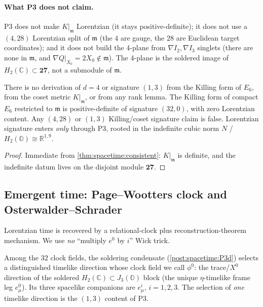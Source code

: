 \paragraph{What P3 does not claim.}
P3 does not make $K|_{\mathfrak m}$ Lorentzian (it stays positive-definite); it does not
use a $(4,28)$ Lorentzian split of $\mathfrak m$ (the $4$ are gauge, the $28$ are
Euclidean target coordinates); and it does not build the 4-plane from $\nabla I_2,
\nabla I_3$ singlets (there are none in $\mathfrak m$, and $\nabla Q|_{X_0}=2X_0\notin\mathfrak m$).
The 4-plane is the soldered image of $H_2(\mathbb C)\subset\mathbf{27}$, not a submodule
of $\mathfrak m$.

\begin{theorem}
\label{thm:spacetime:antikilling}
There is no derivation of $d=4$ or signature $(1,3)$ from the Killing form of $E_6$,
from the coset metric $K|_{\mathfrak m}$, or from any rank lemma. The Killing form of
compact $E_6$ restricted to $\mathfrak m$ is positive-definite of signature $(32,0)$,
with zero Lorentzian content. Any $(4,28)$ or $(1,3)$ Killing/coset signature claim is
false. Lorentzian signature enters \emph{only} through P3, rooted in the indefinite
cubic norm $N$ / $H_2(\mathbb O)\cong\mathbb R^{1,9}$.
\end{theorem}
\begin{proof}
Immediate from \autoref{thm:spacetime:consistent}: $K|_{\mathfrak m}$ is definite, and
the indefinite datum lives on the disjoint module $\mathbf{27}$.
\end{proof}

\subsection{Emergent time: Page--Wootters clock and Osterwalder--Schrader}
\label{sec:spacetime:time}

Lorentzian time is recovered by a relational-clock plus reconstruction-theorem
mechanism. We use \emph{no} ``multiply $e^0$ by $i$'' Wick trick.

\begin{postulate}\label{post:spacetime:clock}
Among the $32$ clock fields, the soldering condensate
(\autoref{post:spacetime:P3d}) selects a distinguished timelike direction whose clock
field we call $\phi^0$: the trace/$X^0$ direction of the soldered
$H_2(\mathbb C)\subset J_3(\mathbb O)$ block (the unique $\eta$-timelike frame leg
$e^0_\mu$). Its three spacelike companions are $e^i_\mu$, $i=1,2,3$. The selection of
\emph{one} timelike direction is the $(1,3)$ content of P3.
\end{postulate}


